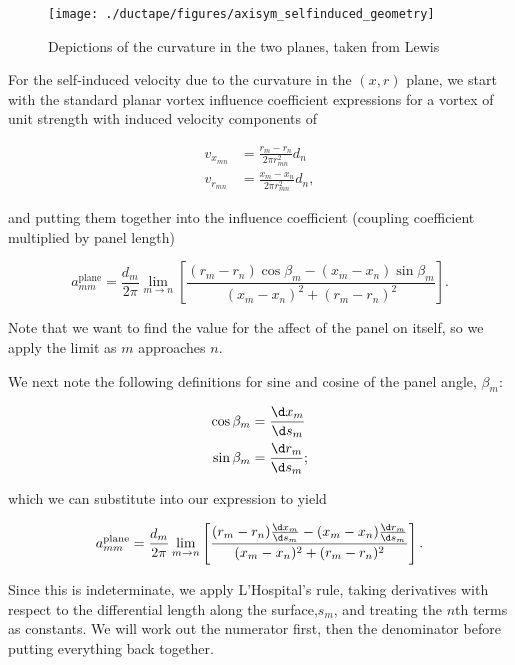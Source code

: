 \begin{figure}[h!]
	\centering
	\texttt{[image: ./ductape/figures/axisym\_selfinduced\_geometry]}
	\caption{Depictions of the curvature in the two planes, taken from Lewis \cite{Lewis_1991}}
	\label{fig:axisym_selfinduced_geometry}
\end{figure}

For the self-induced velocity due to the curvature in the \((x,r)\) plane, we start with the standard planar vortex influence coefficient expressions for a vortex of unit strength with induced velocity components of

\begin{align}
	v_{x_{mn}} &= \frac{r_m - r_n}{2 \pi r^2_{mn}} d_n \\
	v_{r_{mn}} &= \frac{x_m - x_n}{2 \pi r^2_{mn}} d_n,
\end{align}

\noindent and putting them together into the influence coefficient (coupling coefficient multiplied by panel length)

\begin{equation}
	a^\text{plane}_{mm} = \frac{d_m}{2 \pi} \lim_{m\rightarrow n} \left[\frac{(r_m - r_n)\cos \beta_m  - (x_m - x_n)\sin \beta_m}{(x_m - x_n)^2+(r_m - r_n)^2}\right].
\end{equation}

\noindent Note that we want to find the value for the affect of the panel on itself, so we apply the limit as \(m\) approaches \(n\).

We next note the following definitions for sine and cosine of the panel angle, \(\beta_m\):

\begin{align}
	\cos \beta_m  &= \frac{\d x_m}{\d s_m} \\
	\sin \beta_m  &= \frac{\d r_m}{\d s_m};
\end{align}

\noindent which we can substitute into our expression to yield

\begin{equation}
	\label{eqn:aplanemmlimit}
	a^\text{plane}_{mm} = \frac{d_m}{2 \pi} \lim_{m\rightarrow n} \left[\frac{(r_m - r_n) \frac{\d x_m}{\d s_m}  - (x_m - x_n)\frac{\d r_m}{\d s_m}}{(x_m - x_n)^2+(r_m - r_n)^2}\right].
\end{equation}

Since this is indeterminate, we apply L'Hospital's rule, taking derivatives with respect to the differential length along the surface,\(s_m\), and treating the \(n\)th terms as constants.
We will work out the numerator first, then the denominator before putting everything back together.


